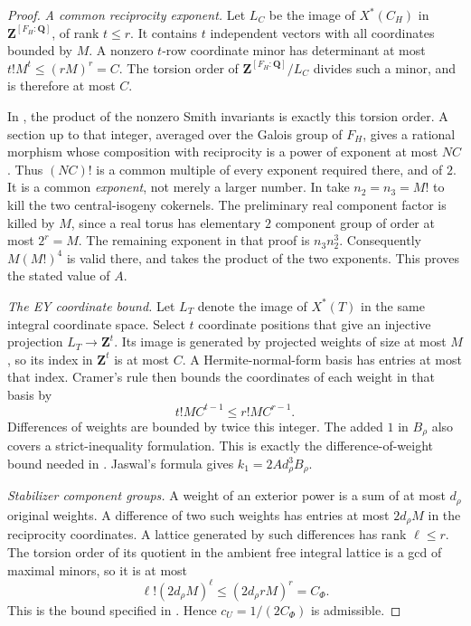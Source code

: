 \documentclass[11pt]{article}
\theoremstyle{definition}
\theoremstyle{remark}
\begin{document}
\begin{proof}
\emph{A common reciprocity exponent.}
Let $L_C$ be the image of $X^*(C_H)$ in
$\mathbf Z^{[F_H:\mathbf Q]}$, of rank $t\le r$.  It contains $t$
independent vectors with all coordinates bounded by $M$.  A nonzero
$t$-row coordinate minor has determinant at most
$t!M^t\le(rM)^r=C$.  The torsion order of
$\mathbf Z^{[F_H:\mathbf Q]}/L_C$ divides such a minor, and is therefore
at most $C$.

In \cite[Lemma~2.7, pp.~15--17]{UllmoYafaev}, the product of the nonzero Smith
invariants is exactly this torsion order.  A section up to that integer,
averaged over the Galois group of $F_H$, gives a rational morphism whose
composition with reciprocity is a power of exponent at most $NC$.
Thus $(NC)!$ is a common multiple of every exponent required there,
and of $2$.  It is a common \emph{exponent}, not merely a larger number.
In \cite[Lemma~2.8, pp.~17--19]{UllmoYafaev} take $n_2=n_3=M!$ to kill the
two central-isogeny cokernels.  The preliminary real component factor
is killed by $M$, since a real torus has elementary $2$ component group
of order at most $2^r=M$.  The remaining exponent in that proof is
$n_3n_2^3$.  Consequently $M(M!)^4$ is valid there, and
\cite[Proposition~2.9, pp.~19--20]{UllmoYafaev} takes the product of the two
exponents.  This proves the stated value of $A$.

\emph{The EY coordinate bound.}
Let $L_T$ denote the image of $X^*(T)$ in the same integral coordinate
space.  Select $t$ coordinate positions that give an injective projection
$L_T\to\mathbf Z^t$.  Its image is generated by projected weights of
size at most $M$, so its index in $\mathbf Z^t$ is at most $C$.
A Hermite-normal-form basis has entries at most that index.  Cramer's
rule then bounds the coordinates of each weight in that basis by
\[
                    t!M C^{t-1}\le r!M C^{r-1}.
\]
Differences of weights are bounded by twice this integer.  The added
$1$ in $B_\rho$ also covers a strict-inequality formulation.
This is exactly the difference-of-weight bound needed in
\cite[Proposition~7.4.3, author version p.~23]{EdixhovenYafaev}.
Jaswal's formula gives $k_1=2Ad_\rho^3B_\rho$.

\emph{Stabilizer component groups.}
A weight of an exterior power is a sum of at most $d_\rho$ original
weights.  A difference of two such weights has entries at most
$2d_\rho M$ in the reciprocity coordinates.  A lattice generated by
such differences has rank $\ell\le r$.  The torsion order of its
quotient in the ambient free integral lattice is a gcd of maximal
minors, so it is at most
\[
       \ell!(2d_\rho M)^\ell\le(2d_\rho rM)^r=C_\Phi.
\]
This is the bound specified in \cite[\S2.3, before Table~1]{Jaswal}.
Hence $c_U=1/(2C_\Phi)$ is admissible.


\end{proof}
\end{document}
